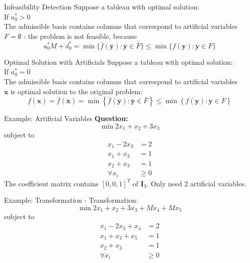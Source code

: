 \documentclass[aspectratio=169,hyperref,UTF8,CJK]{beamer}
\begin{document}
\begin{frame}{Infeasibility Detection}
Suppose a tableau with optimal solution: \\
If \(a_0^* > 0\) \\
The admissible basis contains columns that correspond to artificial variables \\
\(F = \emptyset\) : the problem is not feasible, because
\[
a_0^* M + d_0^* = \min \{\bar{f} (\bar{\mathbf{y}}):\bar{\mathbf{y}}\in \bar{F}\} \leq \min \{f(\mathbf{y}):\mathbf{y}\in F\}
\]
\end{frame}

\begin{frame}{Optimal Solution with Artificials}
Suppose a tableau with optimal solution: \\
If \(a_0^* = 0\) \\
The admissible basis contains columns that correspond to artificial variables \\
\(\mathbf{x}\) is optimal solution to the original problem:
\[
f(\mathbf{x}) = \bar{f} (\bar{\mathbf{x}}) = \min \left\{\bar{f} (\bar{\mathbf{y}}):\bar{\mathbf{y}}\in \bar{F}\right\} \leq \min \left\{f(\mathbf{y}):\mathbf{y}\in F\right\}
\]
\end{frame}

\begin{frame}{Example: Artificial Variables}
\textbf{Question:}
\[
\min 2x_1 + x_2 + 3x_3
\]
subject to
\begin{align*}
x_1 - 2x_3 &= 2 \\
x_1 + x_3 &= 1 \\
x_2 + x_3 &= 1 \\
\forall x_i &\geq 0
\end{align*}
The coefficient matrix contains \([0, 0, 1]^T\) of \(\mathbf{I}_3\). Only need 2 artificial variables.
\end{frame}

\begin{frame}{Example: Transformation}
- Transformation:
\[
\min 2x_1 + x_2 + 3x_3 + Mx_4 + Mx_5
\]
subject to
\begin{align*}
x_1 - 2x_3 + x_4 &= 2 \\
x_1 + x_3 + x_5 &= 1 \\
x_2 + x_3 &= 1 \\
\forall x_i &\geq 0
\end{align*}
\end{frame}
\end{document}
